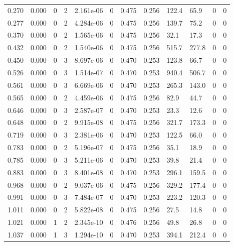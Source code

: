 \documentclass[preview]{standalone}
\begin{document}
{{\begin{tabular}{L{1.2cm}C{1.2cm} C{0.3cm}C{0.5cm} C{1.4cm}C{1.4cm} C{1.4cm}C{1.4cm} C{1.6cm}C{1.6cm} C{1.6cm}C{1.6cm}}
  0.270  &  0.000  & 0     &  2 &  2.161e-06  & 0  &  0.475&   0.256& 122.4 & 65.9   &  0 & 0  \\ 
  0.277  &  0.000  & 0     &  2 &  4.284e-06  & 0  &  0.475&   0.256& 139.7 & 75.2   &  0 & 0  \\ 
  0.370  &  0.000  & 0     &  2 &  1.565e-06  & 0  &  0.475&   0.256& 32.1 & 17.3   &  0 & 0  \\ 
  0.432  &  0.000  & 0     &  2 &  1.540e-06  & 0  &  0.475&   0.256& 515.7 & 277.8   &  0 & 0  \\ 
  0.450  &  0.000  & 0     &  3 &  8.697e-06  & 0  &  0.470&   0.253& 123.8 & 66.7   &  0 & 0  \\ 
  0.526  &  0.000  & 0     &  3 &  1.514e-07  & 0  &  0.470&   0.253& 940.4 & 506.7   &  0 & 0  \\ 
  0.561  &  0.000  & 0     &  3 &  6.669e-06  & 0  &  0.470&   0.253& 265.3 & 143.0   &  0 & 0  \\ 
  0.565  &  0.000  & 0     &  2 &  4.459e-06  & 0  &  0.475&   0.256& 82.9 & 44.7   &  0 & 0  \\ 
  0.646  &  0.000  & 0     &  3 &  2.587e-07  & 0  &  0.470&   0.253& 23.3 & 12.6   &  0 & 0  \\ 
  0.648  &  0.000  & 0     &  2 &  9.915e-08  & 0  &  0.475&   0.256& 321.7 & 173.3   &  0 & 0  \\ 
  0.719  &  0.000  & 0     &  3 &  2.381e-06  & 0  &  0.470&   0.253& 122.5 & 66.0   &  0 & 0  \\ 
  0.783  &  0.000  & 0     &  2 &  5.196e-07  & 0  &  0.475&   0.256& 35.1 & 18.9   &  0 & 0  \\ 
  0.785  &  0.000  & 0     &  3 &  5.211e-06  & 0  &  0.470&   0.253& 39.8 & 21.4   &  0 & 0  \\ 
  0.883  &  0.000  & 0     &  3 &  8.401e-08  & 0  &  0.470&   0.253& 296.1 & 159.5   &  0 & 0  \\ 
  0.968  &  0.000  & 0     &  2 &  9.037e-06  & 0  &  0.475&   0.256& 329.2 & 177.4   &  0 & 0  \\ 
  0.991  &  0.000  & 0     &  3 &  7.484e-07  & 0  &  0.470&   0.253& 223.2 & 120.3   &  0 & 0  \\ 
  1.011  &  0.000  & 0     &  2 &  5.822e-08  & 0  &  0.475&   0.256& 27.5 & 14.8   &  0 & 0  \\ 
  1.021  &  0.000  & 1     &  2 &  2.345e-10  & 0  &  0.476&   0.256& 49.8 & 26.8   &  0 & 0  \\ 
  1.037  &  0.000  & 1     &  3 &  1.294e-10  & 0  &  0.470&   0.253& 394.1 & 212.4   &  0 & 0  \\ 

\end{tabular}}}
\end{document}
